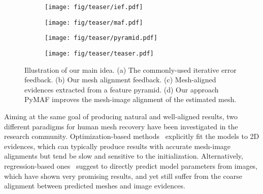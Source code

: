 \documentclass[10pt,twocolumn,letterpaper]{article}
\begin{document}
\begin{figure}[t]
	\centering
    \begin{subfigure}[b]{0.15\textwidth}
		\texttt{[image: fig/teaser/ief.pdf]}
		\caption{}
		\label{fig:ief}
    \end{subfigure}
    \begin{subfigure}[b]{0.2\textwidth}
		\texttt{[image: fig/teaser/maf.pdf]}
		\caption{}
		\label{fig:maf}
    \end{subfigure}
    \begin{subfigure}[b]{0.1\textwidth}
		\texttt{[image: fig/teaser/pyramid.pdf]}
		\caption{}
		\label{fig:pyramid}
    \end{subfigure}
    \begin{subfigure}[b]{0.40\textwidth}
		\texttt{[image: fig/teaser/teaser.pdf]}
		\caption{}
		\label{fig:alignsmpl}
    \end{subfigure}
    \vspace{-3mm}
	\caption{Illustration of our main idea. (a) The commonly-used iterative error feedback. (b) Our mesh alignment feedback. (c) Mesh-aligned evidences extracted from a feature pyramid. (d) Our approach PyMAF improves the mesh-image alignment of the estimated mesh.}
	\vspace{-5mm}
	\label{fig:teaser}
\end{figure}

Aiming at the same goal of producing natural and well-aligned results, two different paradigms for human mesh recovery have been investigated in the research community.
Optimization-based methods~\cite{bogo2016keep,lassner2017unite,zanfir2018monocular} explicitly fit the models to 2D evidences, which can typically produce results with accurate mesh-image alignments but tend be slow and sensitive to the initialization.
Alternatively, regression-based ones~\cite{kanazawa2018end,pavlakos2018learning,kolotouros2019convolutional,kolotouros2019learning} suggest to directly predict model parameters from images, which have shown very promising results, and yet still suffer from the coarse alignment between predicted meshes and image evidences.
\end{document}
